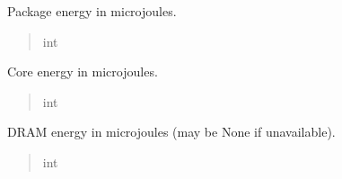 \documentclass[letterpaper,10pt,english]{sphinxmanual}
\begin{document}
\begin{fulllineitems}
\begin{fulllineitems}
\label{\detokenize{core.utils.sampling:core.utils.sampling.EnergySample.package_uj}}
\pysigstartsignatures
\pysigline
{}
\pysigstopsignatures
\sphinxAtStartPar
Package energy in microjoules.
\begin{quote}\begin{description}
\sphinxAtStartPar
int

\end{description}\end{quote}

\end{fulllineitems}


\begin{fulllineitems}
\label{\detokenize{core.utils.sampling:core.utils.sampling.EnergySample.core_uj}}
\pysigstartsignatures
\pysigline
{}
\pysigstopsignatures
\sphinxAtStartPar
Core energy in microjoules.
\begin{quote}\begin{description}
\sphinxAtStartPar
int

\end{description}\end{quote}

\end{fulllineitems}


\begin{fulllineitems}
\label{\detokenize{core.utils.sampling:core.utils.sampling.EnergySample.dram_uj}}
\pysigstartsignatures
\pysigline
{}
\pysigstopsignatures
\sphinxAtStartPar
DRAM energy in microjoules (may be None if unavailable).
\begin{quote}\begin{description}
\sphinxAtStartPar
int

\end{description}\end{quote}

\end{fulllineitems}


\end{fulllineitems}
\end{document}
